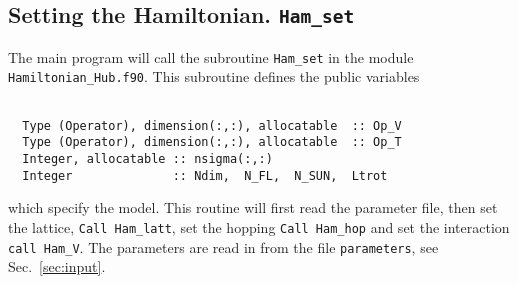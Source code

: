 \subsection{Setting the Hamiltonian.  \texttt{Ham\_set} }
The main program will call the subroutine   \texttt{Ham\_set} in the module \texttt{Hamiltonian\_Hub.f90}.
This  subroutine  defines the  public variables
\begin{lstlisting}

  Type (Operator), dimension(:,:), allocatable  :: Op_V
  Type (Operator), dimension(:,:), allocatable  :: Op_T
  Integer, allocatable :: nsigma(:,:)
  Integer              :: Ndim,  N_FL,  N_SUN,  Ltrot

\end{lstlisting}
which specify the model.  This  routine will first  read the parameter file,  then set the lattice, \texttt{Call Ham\_latt},  set the hopping \texttt{Call Ham\_hop}  and set the interaction
\texttt{call Ham\_V}.  
The parameters are read in from the file \texttt{parameters}, see Sec.~\ref{sec:input}.
% 
% 

